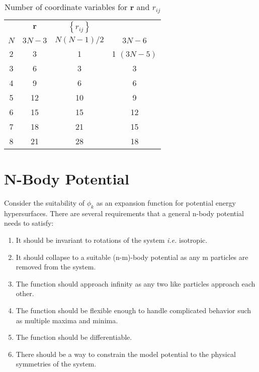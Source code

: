 \documentclass[12pt,thmsa]{article}
\begin{document}
\begin{table}[tbp] \centering%
%
\begin{tabular}{cccc}
\hline\hline
& $\mathbf{r}$ & $\left\{ r_{ij}\right\} $ &  \\ 
$N$ & $3N-3$ & $N\left( N-1\right) /2$ & $3N-6$ \\ \hline
2 & 3 & 1 & 1$\,\,(3N-5)$ \\ 
3 & 6 & 3 & 3 \\ 
4 & 9 & 6 & 6 \\ 
5 & 12 & 10 & 9 \\ 
6 & 15 & 15 & 12 \\ 
7 & 18 & 21 & 15 \\ 
8 & 21 & 28 & 18 \\ \hline
\end{tabular}
\caption{Number of coordinate variables for {\bf{r}} and $ r_{ij} $
\label{Ntab}}%
\end{table}%
%

\section{N-Body Potential}

Consider the suitability of $\phi _k$ as an expansion function for potential
energy hypersurfaces. There are several requirements that a general n-body
potential needs to satisfy:

\begin{enumerate}
\item  It should be invariant to rotations of the system \textit{i.e.}
isotropic.

\item  It should collapse to a suitable (n-m)-body potential as any m
particles are removed from the system.

\item  The function should approach infinity as any two like particles
approach each other.

\item  The function should be flexible enough to handle complicated behavior
such as multiple maxima and minima.

\item  The function should be differentiable.

\item  There should be a way to constrain the model potential to the
physical symmetries of the system.
\end{enumerate}
\end{document}
